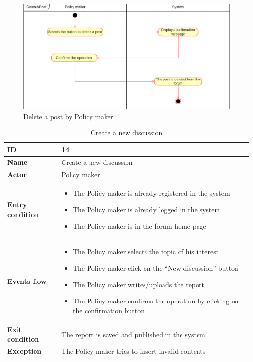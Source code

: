     \begin{figure}[h!]
        \centering
        \includegraphics[scale=0.38]{images/use_cases_diagram/policymaker_delete_post.png}
        \caption{Delete a post by Policy maker}
        \label{fig:policymaker_delete_post}
    \end{figure}
    \FloatBarrier
    \newpage
    \begin{longtable}{p{} | p{}}
    \caption{Create a new discussion}
    \label{tab:create_new_discussion}\\
        \hline
        \textbf{ID} & 14\\
        \hline
        \textbf{Name}  &  Create a new discussion\\
        \hline
        \textbf{Actor}  &  Policy maker\\
        \hline
        \textbf{Entry condition}  &  \begin{itemize}
            \item The Policy maker is already registered in the system
            \item The Policy maker is already logged in the system
            \item The Policy maker is in the forum home page
        \end{itemize}\\
        \hline
        \textbf{Events flow} & \begin{itemize}
                \item The Policy maker selects the topic of his interest
                \item The Policy maker click on the “New discussion” button
                \item The Policy maker writes/uploads the report 
                \item The Policy maker confirms the operation by clicking on the confirmation button
                \end{itemize}
                 \\
        \hline
        \textbf{Exit condition} & The report is saved and published in the system\\
        \hline
        \textbf{Exception} & The Policy maker tries to insert invalid contents\\\hline
    
    \end{longtable}
    
